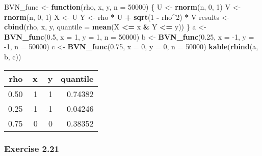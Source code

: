 \documentclass[12pt,]{article}
\newenvironment{Shaded}{\begin{snugshade}}{\end{snugshade}}
\newcommand{\ControlFlowTok}[1]{\textcolor[rgb]{0.13,0.29,0.53}{\textbf{#1}}}
\newcommand{\DataTypeTok}[1]{\textcolor[rgb]{0.13,0.29,0.53}{#1}}
\newcommand{\DecValTok}[1]{\textcolor[rgb]{0.00,0.00,0.81}{#1}}
\newcommand{\FloatTok}[1]{\textcolor[rgb]{0.00,0.00,0.81}{#1}}
\newcommand{\KeywordTok}[1]{\textcolor[rgb]{0.13,0.29,0.53}{\textbf{#1}}}
\newcommand{\NormalTok}[1]{#1}
\newcommand{\OperatorTok}[1]{\textcolor[rgb]{0.81,0.36,0.00}{\textbf{#1}}}
\newcommand{\StringTok}[1]{\textcolor[rgb]{0.31,0.60,0.02}{#1}}
\begin{document}
\begin{Shaded}
\begin{Highlighting}[]
\NormalTok{BVN_func <-}\StringTok{ }\ControlFlowTok{function}\NormalTok{(rho, x, y, }\DataTypeTok{n =} \DecValTok{50000}\NormalTok{) \{}
\NormalTok{    U <-}\StringTok{ }\KeywordTok{rnorm}\NormalTok{(n, }\DecValTok{0}\NormalTok{, }\DecValTok{1}\NormalTok{)}
\NormalTok{    V <-}\StringTok{ }\KeywordTok{rnorm}\NormalTok{(n, }\DecValTok{0}\NormalTok{, }\DecValTok{1}\NormalTok{)}
\NormalTok{    X <-}\StringTok{ }\NormalTok{U}
\NormalTok{    Y <-}\StringTok{ }\NormalTok{rho }\OperatorTok{*}\StringTok{ }\NormalTok{U }\OperatorTok{+}\StringTok{ }\KeywordTok{sqrt}\NormalTok{(}\DecValTok{1} \OperatorTok{-}\StringTok{ }\NormalTok{rho}\OperatorTok{^}\DecValTok{2}\NormalTok{) }\OperatorTok{*}\StringTok{ }\NormalTok{V}
\NormalTok{    results <-}\StringTok{ }\KeywordTok{cbind}\NormalTok{(rho, x, y, }\DataTypeTok{quantile =} \KeywordTok{mean}\NormalTok{(X }\OperatorTok{<=}\StringTok{ }
\StringTok{        }\NormalTok{x }\OperatorTok{&}\StringTok{ }\NormalTok{Y }\OperatorTok{<=}\StringTok{ }\NormalTok{y))}
\NormalTok{\}}
\NormalTok{a <-}\StringTok{ }\KeywordTok{BVN_func}\NormalTok{(}\FloatTok{0.5}\NormalTok{, }\DataTypeTok{x =} \DecValTok{1}\NormalTok{, }\DataTypeTok{y =} \DecValTok{1}\NormalTok{, }\DataTypeTok{n =} \DecValTok{50000}\NormalTok{)}
\NormalTok{b <-}\StringTok{ }\KeywordTok{BVN_func}\NormalTok{(}\FloatTok{0.25}\NormalTok{, }\DataTypeTok{x =} \DecValTok{-1}\NormalTok{, }\DataTypeTok{y =} \DecValTok{-1}\NormalTok{, }\DataTypeTok{n =} \DecValTok{50000}\NormalTok{)}
\NormalTok{c <-}\StringTok{ }\KeywordTok{BVN_func}\NormalTok{(}\FloatTok{0.75}\NormalTok{, }\DataTypeTok{x =} \DecValTok{0}\NormalTok{, }\DataTypeTok{y =} \DecValTok{0}\NormalTok{, }\DataTypeTok{n =} \DecValTok{50000}\NormalTok{)}
\KeywordTok{kable}\NormalTok{(}\KeywordTok{rbind}\NormalTok{(a, b, c))}
\end{Highlighting}
\end{Shaded}

\begin{longtable}[]{@{}rrrr@{}}
\toprule
rho & x & y & quantile\tabularnewline
\midrule
\endhead
0.50 & 1 & 1 & 0.74382\tabularnewline
0.25 & -1 & -1 & 0.04246\tabularnewline
0.75 & 0 & 0 & 0.38352\tabularnewline
\bottomrule
\end{longtable}

\hypertarget{exercise-2.21}{%
\subsubsection{Exercise 2.21}\label{exercise-2.21}}
\end{document}
